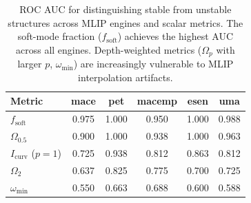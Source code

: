 \begin{table}[htbp]
\centering
\caption{ROC AUC for distinguishing stable from unstable structures across MLIP engines and scalar metrics. The soft-mode fraction ($f_\mathrm{soft}$) achieves the highest AUC across all engines. Depth-weighted metrics ($\Omega_p$ with larger $p$, $\omega_\mathrm{min}$) are increasingly vulnerable to MLIP interpolation artifacts.}
\label{tab:si_roc_auc}
\begin{tabular}{lccccc}
\toprule
Metric & mace & pet & macemp & esen & uma \\
\midrule
$f_\mathrm{soft}$ & 0.975 & 1.000 & 0.950 & 1.000 & 0.988 \\
$\Omega_{0.5}$ & 0.900 & 1.000 & 0.938 & 1.000 & 0.963 \\
$I_\mathrm{curv}$ ($p=1$) & 0.725 & 0.938 & 0.812 & 0.863 & 0.812 \\
$\Omega_{2}$ & 0.637 & 0.825 & 0.775 & 0.700 & 0.725 \\
$\omega_\mathrm{min}$ & 0.550 & 0.663 & 0.688 & 0.600 & 0.588 \\
\bottomrule
\end{tabular}
\end{table}
